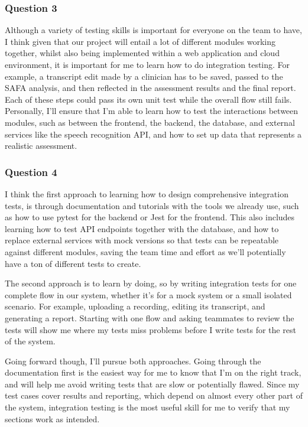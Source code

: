 \documentclass[12pt, titlepage]{article}
\renewcommand{\_}{\oldunderscore\allowbreak}
\begin{document}
\subsubsection*{Question 3}
Although a variety of testing skills is important for everyone on the team to have, I think
given that our project will entail a lot of different modules working together, whilst also being
implemented within a web application and cloud environment, it is important for me to learn how 
to do integration testing. For example, a transcript edit made by a clinician has to be saved, 
passed to the SAFA analysis, and then reflected in the assessment results and the final report.
Each of these steps could pass its own unit test while the overall flow still fails.
Personally, I'll ensure that I'm able to learn how to test the interactions between modules, 
such as between the frontend, the backend, the database, and external services like the speech 
recognition API, and how to set up data that represents a realistic assessment.

\subsubsection*{Question 4}
I think the first approach to learning how to design comprehensive integration tests,
is through documentation and tutorials with the tools we already use, such as how to use pytest 
for the backend or Jest for the frontend. This also includes learning how to test API endpoints 
together with the database, and how to replace external services with mock versions so that 
tests can be repeatable against different modules, saving the team time and effort as we'll
potentially have a ton of different tests to create.

The second approach is to learn by doing, so by writing integration tests for one complete 
flow in our system, whether it's for a mock system or a small isolated scenario. For example,
uploading a recording, editing its transcript, and generating a report.
Starting with one flow and asking teammates to review the tests will show me where my 
tests miss problems before I write tests for the rest of the system.

Going forward though, I'll pursue both approaches. Going through the documentation first is the easiest way for me to know that I'm on the right track, and will help me
avoid writing tests that are slow or potentially flawed. Since my test cases cover results and reporting, which depend
on almost every other part of the system, integration testing is the most useful skill for me to verify
that my sections work as intended.
\end{document}
